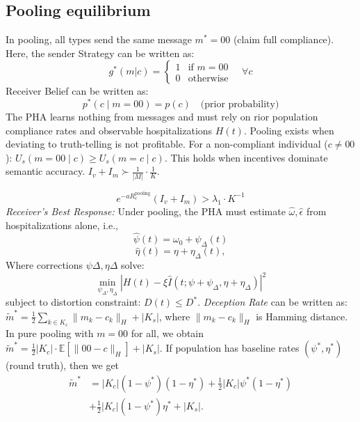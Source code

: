 \documentclass[sigconf,review]{acmart}
\begin{document}
\subsection{Pooling equilibrium}
In pooling, all types send the same message $m^* = 00$ (claim full compliance).
Here, the sender Strategy can be written as:
\begin{equation}
    g^*(m|c) = 
\begin{cases}
1 & \text{if } m = 00 \\
0 & \text{otherwise}
\end{cases}
\quad \forall c
\end{equation}
Receiver Belief  can be written as:
\begin{equation}
    p^*(c \mid m = 00) = p(c) \quad \text{(prior probability)}
\end{equation}
The PHA learns nothing from messages and must rely on rior population compliance rates and observable hospitalizations $H(t)$.
Pooling exists when deviating to truth-telling is not profitable. For a non-compliant individual ($c \neq 00$):
$
U_s(m = 00 \mid c) \geq U_s(m = c \mid c)$.
This holds when incentives dominate semantic accuracy. 
$
I_v + I_m \succ \frac{1}{|M|} \cdot \frac{1}{K}$. 

\[
e^{-a R_c^{\text{pooling}}} (I_v + I_m) > \lambda_1 \cdot K^{-1}
\]
\emph{Receiver's Best Response:}
Under pooling, the PHA must estimate $\hat{\omega}, \hat{\epsilon}$ from hospitalizations alone, i.e.,
\[
\hat{\psi}(t) = \omega_0 + \psi_{\Delta}(t)
\]
\[
\hat{\eta}(t) = \eta + \eta_{\Delta}(t),
\]
Where corrections $\psi{\Delta}, \eta{\Delta}$ solve:
\[
\min_{\psi_{\Delta}, \eta_{\Delta}} \left| H(t) - \xi\hat{I}(t; \psi + \psi_{\Delta}, \eta + \eta_{\Delta}) \right|^2
\]
subject to distortion constraint:
$
D(t) \leq D^*$.
\emph{Deception Rate}
can be written as:
$\tilde{m}^* = \frac{1}{2} \sum_{k \in K_c} \| m_k - c_k \|_H + |K_s|
$, where $\| m_k - c_k \|_H$ is Hamming distance. In pure pooling with $m = 00$ for all, we obtain
$
\tilde{m}^* = \frac{1}{2} |K_c| \cdot \mathbb{E}[\| 00 - c \|_H] + |K_s|
$.
If population has baseline rates $(\psi^\ast, \eta^\ast)$ (round truth), then we get
\begin{equation}
\begin{aligned}
\tilde{m}^* &= |K_c|(1 - \psi^\ast)(1 - \eta^\ast) + \frac{1}{2}|K_c|\psi^\ast(1 - \eta^\ast) \\ &+\frac{1}{2}|K_c|(1-\psi^\ast) \eta^\ast+  |K_s|.
\end{aligned}
\end{equation}
\end{document}
